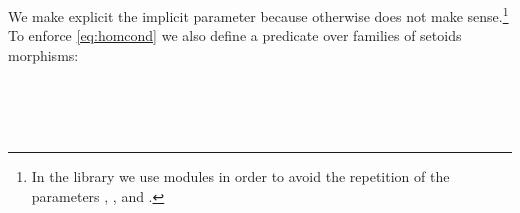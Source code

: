\noindent We make explicit the implicit parameter  because
otherwise   does not make sense.\footnote{In the library we
  use modules in order to avoid the repetition of the parameters ,
  , and .} To enforce \eqref{eq:homcond} we also define a
predicate over families of setoids morphisms:



\begin{code}
\>[2]\AgdaSpace{}%
\AgdaSymbol{:}\AgdaSpace{}%
\AgdaSpace{}%
\AgdaSymbol{\{}\AgdaSymbol{\}}\AgdaSpace{}%
\AgdaSymbol{\{}\AgdaSpace{}\AgdaSymbol{\}}\AgdaSpace{}%
\AgdaSpace{}%
\AgdaSpace{}\AgdaSpace{}\AgdaSpace{}%
\AgdaSpace{}%
\<%
\\
%
\>[2]\AgdaSpace{}%
\AgdaSymbol{\{}%
\>[142I]\AgdaSymbol{=}\AgdaSpace{}%
\AgdaSymbol{\}}\AgdaSpace{}%
\AgdaSymbol{\{}\AgdaSymbol{\}}\AgdaSpace{}%
\AgdaSpace{}%
\AgdaSymbol{=}\AgdaSpace{}\<%
\\
\>[.]\<[142I]%
\>[14]\AgdaSpace{}%
\AgdaSymbol{\{}\AgdaSpace{}\AgdaSymbol{\}}\AgdaSpace{}%
\AgdaSymbol{(}\AgdaSpace{}%
\AgdaSymbol{:}\AgdaSpace{}%
\AgdaSpace{}%
\AgdaSpace{}%
\AgdaSymbol{(}\AgdaSpace{}%
\AgdaOperator{\AgdaInductiveConstructor{,}}\AgdaSpace{}%
\AgdaSymbol{)}\AgdaSpace{}%
\AgdaSymbol{)}\AgdaSpace{}%
\AgdaSpace{}%
\AgdaSymbol{(}\AgdaSpace{}%
\AgdaSymbol{:}\AgdaSpace{}%
\AgdaSpace{}%
\AgdaSpace{}%
\AgdaSpace{}%
\AgdaSymbol{)}\AgdaSpace{}%
\<%
\\
\>[.]\<[142I]%
\>[14]\AgdaSymbol{(}\AgdaSpace{}%
\AgdaSpace{}%
\AgdaSpace{}%
\AgdaSymbol{(}\AgdaSpace{}%
\AgdaSpace{}%
\AgdaSpace{}%
\AgdaSpace{}%
\AgdaSpace{}%
\AgdaSymbol{))}\AgdaSpace{}%
\AgdaSpace{}%
\AgdaSymbol{(}\AgdaSpace{}%
\AgdaSpace{}%
\AgdaSpace{}%
\AgdaSpace{}%
\AgdaSpace{}%
\AgdaSymbol{(}\AgdaSpace{}%
\AgdaSpace{}%
\AgdaSymbol{))}\<%
\end{code}


